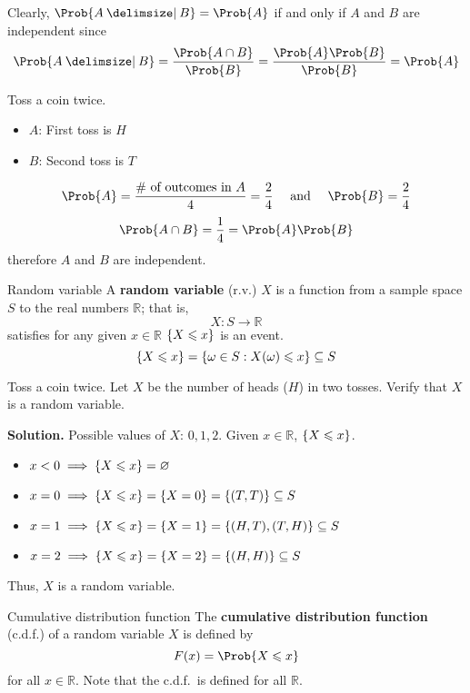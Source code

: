 Clearly, $ \Prob{A\given B}=\Prob{A} $ if and only if $ A $ and $ B $ are independent since
\[ \Prob{A\given B}=\frac{\Prob{A\cap B}}{\Prob{B}}=\frac{\Prob{A}\Prob{B}}{\Prob{B}}=\Prob{A}  \]

\begin{Example}{}{}
    Toss a coin twice.
    \begin{itemize}
        \item $ A $: First toss is $ H $
        \item $ B $: Second toss is $ T $
    \end{itemize}
    \[ \Prob{A}=\frac{\text{\# of outcomes in }A}{4}=\frac{2}{4}\quad
        \text{ and }\quad \Prob{B}=\frac{2}{4} \]
    \[ \Prob{A\cap B}=\frac{1}{4}=\Prob{A}\Prob{B} \]
    therefore $ A $ and $ B $ are independent.
\end{Example}

\begin{Definition}{Random variable}{}
    A \textbf{random variable} (r.v.) $ X $
    is a function from a sample space $ S $ to the real numbers $ \mathbb{R} $; that is,
    \[ X:S\to \mathbb{R} \] satisfies for any given $ x\in\mathbb{R} $
    $ \{X\leqslant x\} $ is an event.
    \[ \{X\leqslant x\}=\{\omega\in S:X(\omega)\leqslant x\}
        \subseteq S \]
\end{Definition}

\begin{Example}{}{}
    Toss a coin twice. Let $ X $ be the number of heads ($ H $) in two tosses.
    Verify that $ X $ is a random variable.

    \textbf{Solution.}
    Possible values of $ X $: $ 0,1,2 $. Given $ x\in\mathbb{R} $,
    $ \{X\leqslant x\} $.
    \begin{itemize}
        \item $ x<0 \implies \{X\leqslant x\}=\varnothing $
        \item $ x=0 \implies \{X\leqslant x\}=\{X=0\}=\{(T,T)\}\subseteq S$
        \item $ x=1 \implies \{X\leqslant x\}=\{X=1\}=\{(H,T),(T,H)\}
                  \subseteq S $
        \item $ x=2 \implies \{X\leqslant x\}=\{X=2\}=
                  \{(H,H)\}\subseteq S $
    \end{itemize}
    Thus, $ X $ is a random variable.
\end{Example}

\begin{Definition}{Cumulative distribution function}{}
    The \textbf{cumulative distribution function} (c.d.f.) of a random variable
    $ X $ is defined by
    \[ F(x)=\Prob{X\leqslant x} \]
    for all $ x\in\mathbb{R} $. Note that the c.d.f.\ is defined for all $ \mathbb{R} $.
\end{Definition}

